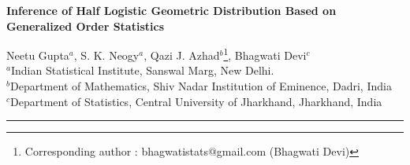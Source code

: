 \documentclass[11pt,a4paper]{article}
\makeatletter
\numberwithin{equation}{section}
\def\correspondingauthor{\footnote{Corresponding author : bhagwatistats@gmail.com (Bhagwati Devi)}}
\makeatother
\begin{document}
	\begin{center}

		{\Large\bf Inference of Half Logistic Geometric Distribution Based on  Generalized Order Statistics}\\

		\vspace{0.5cm}

		

		Neetu Gupta$^{a}$, S. K. Neogy$^{a}$, Qazi J. Azhad$^{b}$\correspondingauthor{}, Bhagwati Devi$^{c}$ \\

		$^{a}$Indian Statistical Institute, Sanswal Marg, New Delhi.\\

		$^{b}$Department of Mathematics, Shiv Nadar Institution of Eminence, Dadri, India\\

		$^{c}$Department of Statistics, Central University of Jharkhand, Jharkhand, India\\

	\end{center}

	\hrule

	\begin{abstract}

		\noindent As the unification of various models of ordered quantities, generalized order statistics act as a simplistic approach introduced in \cite{kamps1995concept}. In this present study, results pertaining to the expressions of marginal and joint moment generating functions from half logistic geometric distribution are presented based on generalized order statistics framework. We also consider the estimation problem of $\theta$ and provides a Bayesian framework. The two widely and popular  methods called Markov chain Monte Carlo and Lindley approximations are used for obtaining the Bayes estimators.The results are derived under symmetric and asymmetric loss functions. Analysis of the special cases of generalized order statistics, \textit{i.e.,} order statistics is also presented. To have an insight into the practical applicability of the proposed results, two real data sets, one from the field of Demography and, other from reliability have been taken for analysis.\\

		

		\noindent    \textbf{Keywords:} Moment generating function, order statistics, Markov chain Monte Carlo, Lindley approximation, COVID 19 data

	\end{abstract}
\end{document}
